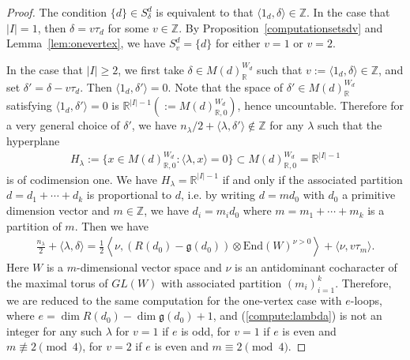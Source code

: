 \documentclass[10pt,a4paper]{amsart}
\renewcommand{\geq}{\geqslant}
\begin{document}
\begin{proof}
    The condition $\{d\} \in S_{\delta}^d$ is equivalent to that 
    $\langle 1_d, \delta \rangle \in \mathbb{Z}$. 
    In the case that $\lvert I \rvert=1$, then $\delta=v\tau_d$ for some $v \in \mathbb{Z}$. 
    By Proposition~\ref{computationsetsdv} and Lemma~\ref{lem:onevertex}, we have 
    $S_{v}^d=\{d\}$ for either $v=1$ or $v=2$. 
    
    In the case that $\lvert I \rvert \geq 2$, 
    we first take $\delta \in M(d)_{\mathbb{R}}^{W_d}$
    such that $v:=\langle 1_d, \delta \rangle \in \mathbb{Z}$, and set $\delta'=\delta-v\tau_d$. 
    Then $\langle 1_d, \delta' \rangle =0$. 
Note that the space of 
    $\delta' \in M(d)_{\mathbb{R}}^{W_d}$ satisfying $\langle 1_d, \delta' \rangle=0$
    is $\mathbb{R}^{\lvert I \rvert-1}(:=M(d)_{\mathbb{R}, 0}^{W_d})$, hence uncountable. 
Therefore for a very general choice of $\delta'$, 
we have $n_{\lambda}/2+\langle \lambda, \delta' \rangle \notin \mathbb{Z}$
for any $\lambda$ such that the hyperplane 
\begin{align*}H_{\lambda}:=\{x\in M(d)_{\mathbb{R}, 0}^{W_d}: \langle \lambda, x \rangle=0\} 
\subset M(d)_{\mathbb{R}, 0}^{W_d}=\mathbb{R}^{\lvert I \rvert-1}
\end{align*}
is of codimension one. We have 
$H_{\lambda}=\mathbb{R}^{\lvert I \rvert-1}$ if and only 
if the associated partition 
$d=d_1+\cdots+d_k$ is proportional to $d$, i.e. 
by writing $d=m d_0$ with $d_0$ a primitive dimension 
vector and $m \in \mathbb{Z}$, we have $d_i=m_i d_0$
where $m=m_1+\cdots+m_k$ is a partition of $m$. 
Then we have 
\begin{align}\label{compute:lambda}
    \frac{n_{\lambda}}{2}+\langle \lambda, \delta \rangle 
    =\frac{1}{2}\left\langle \nu, (R(d_0)-\mathfrak{g}(d_0))
    \otimes \mathrm{End}(W)^{\nu >0} \right\rangle +\langle \nu, v\tau_m
    \rangle. 
\end{align}
Here $W$ is a $m$-dimensional vector space 
and $\nu$ is an antidominant cocharacter of the maximal 
torus of $GL(W)$ with associated partition $(m_i)_{i=1}^k$. 
Therefore, we are reduced to the same computation
for the one-vertex case
with $e$-loops, where 
$e=\dim R(d_0)-\dim \mathfrak{g}(d_0)+1$,
and 
(\ref{compute:lambda}) is not an integer
for any such $\lambda$ for $v=1$ if $e$ is odd, for $v=1$ if $e$ is even and  
$m \not\equiv 2 \pmod 4$, for $v=2$ if 
$e$ is even and $m\equiv 2 \pmod 4$. 
\end{proof}
\end{document}
